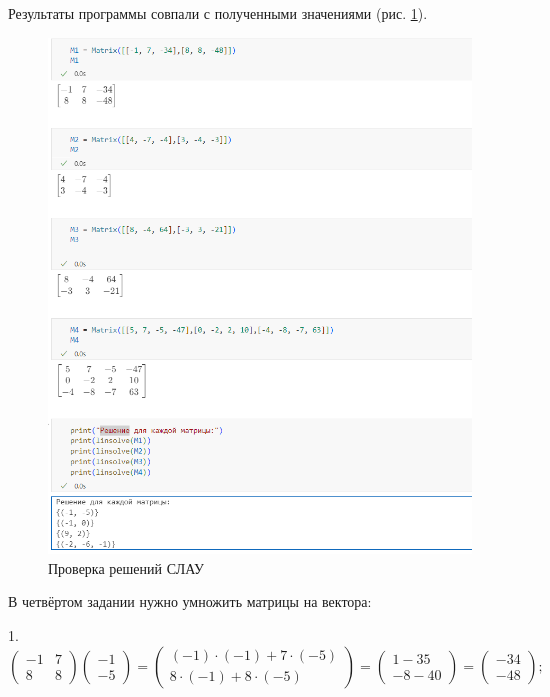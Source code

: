 \documentclass[14pt,a4paper]{extarticle}
\begin{document}
Результаты программы совпали с полученными значениями (рис. \ref{pic:sly1}).
\begin{figure}[h!]
    \centering
    \includegraphics[scale=0.6]{pic8/1.png}
    \caption{Проверка решений СЛАУ}
    \label{pic:sly1}
\end{figure}
\FloatBarrier

В четвёртом задании нужно умножить матрицы на вектора:

1.\[\begin{pmatrix} -1 & 7 \\ 8 & 8 \end{pmatrix}\begin{pmatrix} -1 \\ -5 \end{pmatrix} 
= \begin{pmatrix} (-1) \cdot (-1) + 7 \cdot (-5) \\ 8 \cdot (-1) + 8 \cdot (-5) \end{pmatrix}=
\begin{pmatrix} 1 - 35 \\ -8 - 40 \end{pmatrix}
=\begin{pmatrix} -34 \\ -48 \end{pmatrix};\]
\end{document}
